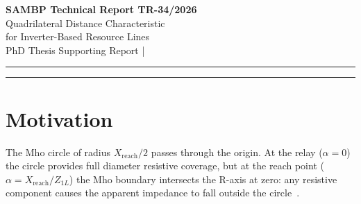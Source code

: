 \documentclass[11pt,a4paper]{article}
\begin{document}
\begin{center}
  {\LARGE\bfseries\color{sambpblue}
    SAMBP Technical Report TR-34/2026}\\[6pt]
  {\large Quadrilateral Distance Characteristic\\
    for Inverter-Based Resource Lines}\\[10pt]
  {\normalsize PhD Thesis Supporting Report \quad|}
\end{center}

\vspace{2pt}\hrule\vspace{8pt}

\begin{abstract}
\noindent
The cross-polarised Mho characteristic (TR-30) provides excellent metallic-fault
coverage but its resistive reach shrinks to zero at the Zone~1 boundary.  For
IBR-fed lines the apparent arc resistance is amplified by the infeed factor
$(1 + 1/k_\mathrm{ibr})$: at $k_\mathrm{ibr}=0.10$ a 4\,m$\Omega$ arc becomes
44\,m$\Omega$ at the relay, well beyond the Mho boundary.  This report
characterises the quadrilateral (quad) distance element, which has independent
reactance ($X_\mathrm{reach}$) and forward resistance ($R_\mathrm{fwd}$)
settings.  Five studies establish: (A)~the quad Zone~1 boundary and comparison
with Mho; (B)~arc-resistance coverage as a function of $k_\mathrm{ibr}$;
(C)~the $R_\mathrm{fwd}$ setting rule for IBR infeed;
(D)~load-encroachment security via the angle blinder;
(E)~the complete IBR fault trajectory through the quad vs Mho.
Key result: $R_\mathrm{fwd1}=0.030$\,pu covers arcing faults with
$R_\mathrm{arc}\leq0.004$\,pu for all $k_\mathrm{ibr}\geq0.10$, and the quad
characteristic combined with POTT (TR-33) eliminates the last remaining metallic
Region~B clearance gap.
\end{abstract}

\vspace{4pt}\hrule\vspace{10pt}

\section{Motivation}
\label{sec:motivation}

The Mho circle of radius $X_\mathrm{reach}/2$ passes through the origin.  At the
relay ($\alpha=0$) the circle provides full diameter resistive coverage, but at
the reach point ($\alpha=X_\mathrm{reach}/Z_{1L}$) the Mho boundary intersects
the R-axis at zero: any resistive component causes the apparent impedance to fall
outside the circle~\cite{Blackburn2006}.
\end{document}
